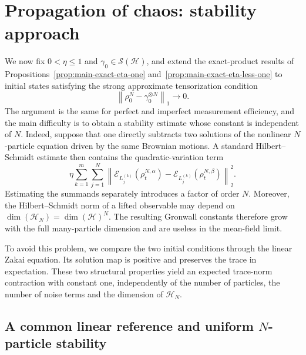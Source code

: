 \documentclass[10pt,a4paper,reqno]{amsart}
\numberwithin{equation}{section}
\theoremstyle{plain}
\theoremstyle{definition}
\theoremstyle{remark}
\newcommand{\cS}{\mathcal S}
\newcommand{\cE}{\mathcal E}
\newcommand{\HH}{\mathcal H}
\newcommand{\1}{\mathbf 1}
\begin{document}
\section{Propagation of chaos: stability approach}
\label{sec:initial-perturbation}


We now fix \(0<\eta\le1\) and \(\gamma_0\in\cS(\HH)\), and extend the exact-product results of Propositions~\ref{prop:main-exact-eta-one} and~\ref{prop:main-exact-eta-less-one} to initial states satisfying the strong approximate tensorization condition
\[
  \left\|
    \rho_0^N-\gamma_0^{\otimes N}
  \right\|_1
  \longrightarrow0.
\]
The argument is the same for perfect and imperfect measurement efficiency,  and  the main difficulty is to obtain a stability estimate whose constant is
independent of \(N\).  Indeed, suppose that one directly subtracts two
solutions of the nonlinear \(N\)-particle equation driven by the same
Brownian motions.  A standard Hilbert--Schmidt estimate then contains the
quadratic-variation term
\[
  \eta
  \sum_{k=1}^m\sum_{j=1}^N
  \left\|
    \cE_{L_j^{(k)}}(\rho_t^{N,\alpha})
    -
    \cE_{L_j^{(k)}}(\rho_t^{N,\beta})
  \right\|_2^2.
\]
Estimating the summands separately introduces a factor of order \(N\).
Moreover, the Hilbert--Schmidt norm of a lifted observable may depend on
\(\dim(\HH_N)=\dim(\HH)^N\).  The resulting Gronwall constants therefore
grow with the full many-particle dimension and are useless in the
mean-field limit.

To avoid this problem, we compare the two initial conditions through the
linear Zakai equation.  Its solution map is positive and
preserves the trace in expectation.  These two structural properties yield
an expected trace-norm contraction with constant one, independently of the
number of particles, the number of noise terms and the dimension of
\(\HH_N\).



\subsection{A common linear reference and uniform
\texorpdfstring{\(N\)}{N}-particle stability}
\label{subsec:common-reference}
\end{document}
